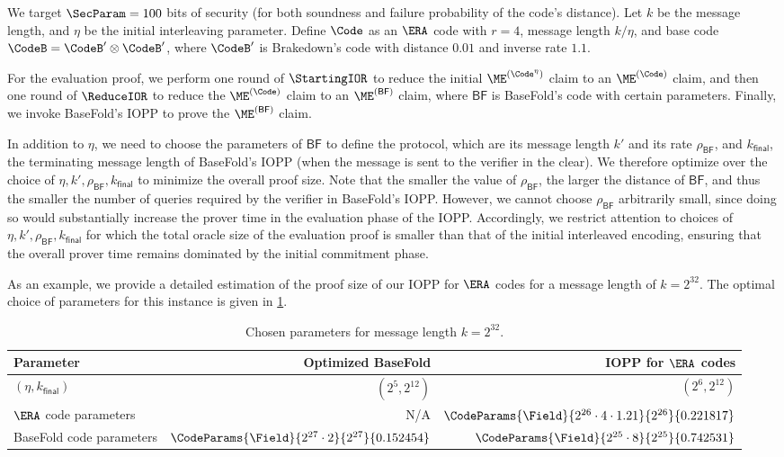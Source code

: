 We target $\SecParam = 100$ bits of security (for both soundness and failure probability of the code's distance).
Let $k$ be the message length, and $\eta$ be the initial interleaving parameter.
Define $\Code$ as an $\ERA$ code with $r = 4$, message length $k / \eta$, and base code $\CodeB = \CodeB' \otimes \CodeB'$, where $\CodeB'$ is Brakedown's code with distance $0.01$ and inverse rate $1.1$.

For the evaluation proof, we perform one round of $\StartingIOR$ to reduce the initial $\ME^{(\Code^{\eta})}$ claim to an $\ME^{(\Code)}$ claim, and then one round of $\ReduceIOR$ to reduce the $\ME^{(\Code)}$ claim to an $\ME^{(\mathsf{BF})}$ claim, where $\mathsf{BF}$ is BaseFold's code with certain parameters.
Finally, we invoke BaseFold's IOPP to prove the $\ME^{(\mathsf{BF})}$ claim.

In addition to $\eta$, we need to choose the parameters of $\mathsf{BF}$ to define the protocol, which are its message length $k'$ and its rate $\rho_{\mathsf{BF}}$, and $k_{\mathsf{final}}$, the terminating message length of BaseFold's IOPP (when the message is sent to the verifier in the clear).
We therefore optimize over the choice of $\eta, k', \rho_{\mathsf{BF}}, k_{\mathsf{final}}$ to minimize the overall proof size.
Note that the smaller the value of $\rho_{\mathsf{BF}}$, the larger the distance of $\mathsf{BF}$, and thus the smaller the number of queries required by the verifier in BaseFold's IOPP.
However, we cannot choose $\rho_{\mathsf{BF}}$ arbitrarily small, since doing so would substantially increase the prover time in the evaluation phase of the IOPP.
Accordingly, we restrict attention to choices of $\eta, k', \rho_{\mathsf{BF}}, k_{\mathsf{final}}$ for which the total oracle size of the evaluation proof is smaller than that of the initial interleaved encoding, ensuring that the overall prover time remains dominated by the initial commitment phase.


As an example, we provide a detailed estimation of the proof size of our IOPP for $\ERA$ codes for a message length of $k = 2^{32}$.
The optimal choice of parameters for this instance is given in \cref{tab:parameters-iopp}.

\begin{table}[htbp]
\centering
\begin{tabular}{lrr}
\toprule
\textbf{Parameter} & \textbf{Optimized BaseFold} & \textbf{IOPP for $\ERA$ codes} \\
\midrule
$(\eta, k_{\mathsf{final}})$ & $(2^5, 2^{12})$ & $(2^6, 2^{12})$ \\
$\ERA$ code parameters & N/A & $\CodeParams{\Field}{2^{26} \cdot 4 \cdot 1.21}{2^{26}}{0.221817}$ \\
BaseFold code parameters &  $\CodeParams{\Field}{2^{27} \cdot 2}{2^{27}}{0.152454}$ & $\CodeParams{\Field}{2^{25} \cdot 8}{2^{25}}{0.742531}$ \\
\bottomrule
\end{tabular}
\caption{Chosen parameters for message length $k=2^{32}$.}
\label{tab:parameters-iopp}
\end{table}

